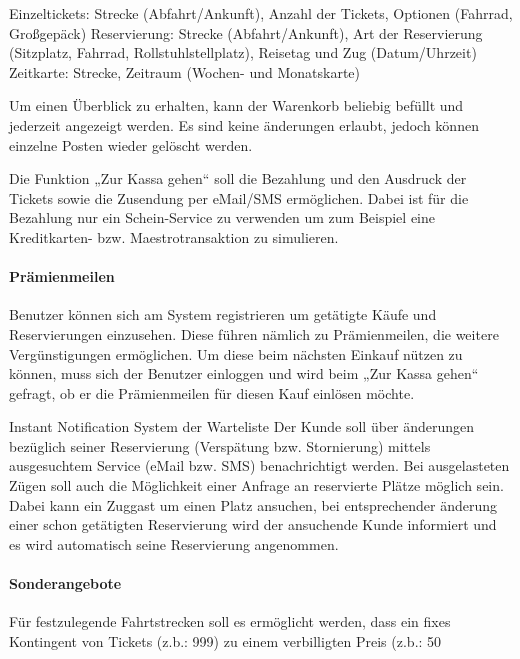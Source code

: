 Einzeltickets: Strecke (Abfahrt/Ankunft), Anzahl der Tickets, Optionen (Fahrrad, Großgep{\"a}ck)
Reservierung: Strecke (Abfahrt/Ankunft), Art der Reservierung (Sitzplatz, Fahrrad, Rollstuhlstellplatz), Reisetag und Zug (Datum/Uhrzeit)
Zeitkarte: Strecke, Zeitraum (Wochen- und Monatskarte)

Um einen {\"U}berblick zu erhalten, kann der Warenkorb beliebig bef{\"u}llt und jederzeit angezeigt werden. Es sind keine {\"a}nderungen erlaubt, jedoch k{\"o}nnen einzelne Posten wieder gel{\"o}scht werden.

Die Funktion „Zur Kassa gehen“ soll die Bezahlung und den Ausdruck der Tickets sowie die Zusendung per eMail/SMS erm{\"o}glichen. Dabei ist f{\"u}r die Bezahlung nur ein Schein-Service zu verwenden um zum Beispiel eine Kreditkarten- bzw. Maestrotransaktion zu simulieren.


\paragraph{Pr{\"a}mienmeilen}
Benutzer k{\"o}nnen sich am System registrieren um get{\"a}tigte K{\"a}ufe und Reservierungen einzusehen. Diese f{\"u}hren n{\"a}mlich zu Pr{\"a}mienmeilen, die weitere Verg{\"u}nstigungen erm{\"o}glichen. Um diese beim n{\"a}chsten Einkauf n{\"u}tzen zu k{\"o}nnen, muss sich der Benutzer einloggen und wird beim „Zur Kassa gehen“ gefragt, ob er die Pr{\"a}mienmeilen f{\"u}r diesen Kauf einl{\"o}sen m{\"o}chte.


Instant Notification System der Warteliste
Der Kunde soll {\"u}ber {\"a}nderungen bez{\"u}glich seiner Reservierung (Versp{\"a}tung bzw. Stornierung) mittels ausgesuchtem Service (eMail bzw. SMS) benachrichtigt werden. Bei ausgelasteten Z{\"u}gen soll auch die M{\"o}glichkeit einer Anfrage an reservierte Pl{\"a}tze m{\"o}glich sein. Dabei kann ein Zuggast um einen Platz ansuchen, bei entsprechender {\"a}nderung einer schon get{\"a}tigten Reservierung wird der ansuchende Kunde informiert und es wird automatisch seine Reservierung angenommen.


\paragraph{Sonderangebote}
F{\"u}r festzulegende Fahrtstrecken soll es erm{\"o}glicht werden, dass ein fixes Kontingent von Tickets (z.b.: 999) zu einem verbilligten Preis (z.b.: 50%

